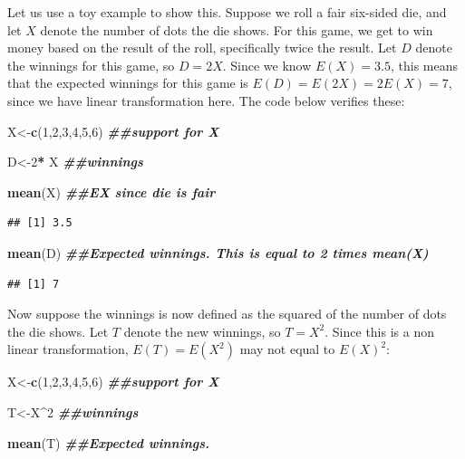 \documentclass[
]{book}
\newenvironment{Shaded}{\begin{snugshade}}{\end{snugshade}}
\newcommand{\DecValTok}[1]{\textcolor[rgb]{0.00,0.00,0.81}{#1}}
\newcommand{\DocumentationTok}[1]{\textcolor[rgb]{0.56,0.35,0.01}{\textbf{\textit{#1}}}}
\newcommand{\FunctionTok}[1]{\textcolor[rgb]{0.13,0.29,0.53}{\textbf{#1}}}
\newcommand{\NormalTok}[1]{#1}
\newcommand{\OtherTok}[1]{\textcolor[rgb]{0.56,0.35,0.01}{#1}}
\newcommand{\SpecialCharTok}[1]{\textcolor[rgb]{0.81,0.36,0.00}{\textbf{#1}}}
\begin{document}
Let us use a toy example to show this. Suppose we roll a fair six-sided die, and let \(X\) denote the number of dots the die shows. For this game, we get to win money based on the result of the roll, specifically twice the result. Let \(D\) denote the winnings for this game, so \(D = 2X\). Since we know \(E(X) = 3.5\), this means that the expected winnings for this game is \(E(D) = E(2X) = 2E(X) = 7\), since we have linear transformation here. The code below verifies these:

\begin{Shaded}
\begin{Highlighting}[]
\NormalTok{X}\OtherTok{\textless{}{-}}\FunctionTok{c}\NormalTok{(}\DecValTok{1}\NormalTok{,}\DecValTok{2}\NormalTok{,}\DecValTok{3}\NormalTok{,}\DecValTok{4}\NormalTok{,}\DecValTok{5}\NormalTok{,}\DecValTok{6}\NormalTok{) }\DocumentationTok{\#\#support for X}

\NormalTok{D}\OtherTok{\textless{}{-}}\DecValTok{2}\SpecialCharTok{*}\NormalTok{ X }\DocumentationTok{\#\#winnings}

\FunctionTok{mean}\NormalTok{(X) }\DocumentationTok{\#\#EX since die is fair}
\end{Highlighting}
\end{Shaded}

\begin{verbatim}
## [1] 3.5
\end{verbatim}

\begin{Shaded}
\begin{Highlighting}[]
\FunctionTok{mean}\NormalTok{(D) }\DocumentationTok{\#\#Expected winnings. This is equal to 2 times mean(X)}
\end{Highlighting}
\end{Shaded}

\begin{verbatim}
## [1] 7
\end{verbatim}

Now suppose the winnings is now defined as the squared of the number of dots the die shows. Let \(T\) denote the new winnings, so \(T = X^2\). Since this is a non linear transformation, \(E(T) = E(X^2)\) may not equal to \(E(X)^2\):

\begin{Shaded}
\begin{Highlighting}[]
\NormalTok{X}\OtherTok{\textless{}{-}}\FunctionTok{c}\NormalTok{(}\DecValTok{1}\NormalTok{,}\DecValTok{2}\NormalTok{,}\DecValTok{3}\NormalTok{,}\DecValTok{4}\NormalTok{,}\DecValTok{5}\NormalTok{,}\DecValTok{6}\NormalTok{) }\DocumentationTok{\#\#support for X}

\NormalTok{T}\OtherTok{\textless{}{-}}\NormalTok{X}\SpecialCharTok{\^{}}\DecValTok{2} \DocumentationTok{\#\#winnings}

\FunctionTok{mean}\NormalTok{(T) }\DocumentationTok{\#\#Expected winnings. }
\end{Highlighting}
\end{Shaded}
\end{document}
